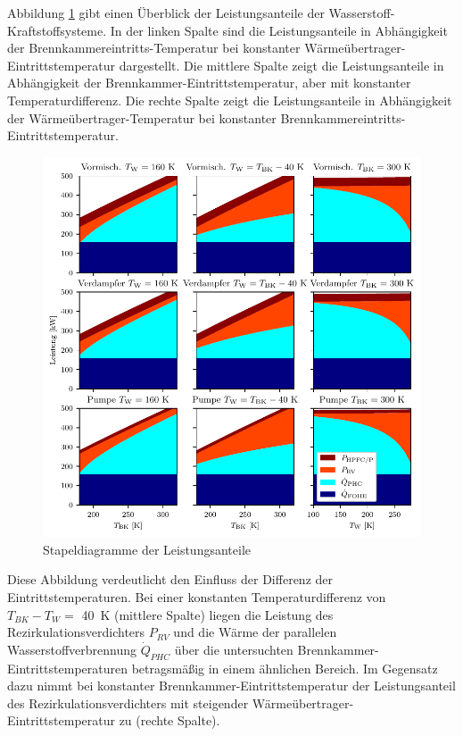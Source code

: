 Abbildung \ref{fig:stackplot} gibt einen Überblick der Leistungsanteile der Wasserstoff-Kraftstoffsysteme. In der linken Spalte sind die Leistungsanteile in Abhängigkeit der Brennkammereintritts-Temperatur bei konstanter Wärmeübertrager-Eintrittstemperatur dargestellt. Die mittlere Spalte zeigt die Leistungsanteile in Abhängigkeit der Brennkammer-Eintrittstemperatur, aber mit konstanter Temperaturdifferenz. Die rechte Spalte zeigt die Leistungsanteile in Abhängigkeit der Wärmeübertrager-Temperatur bei konstanter Brennkammereintritts-Eintrittstemperatur.

\begin{figure}[ht]
\centering
\includegraphics[width=1\linewidth]{4_Abbildungen/2_Hauptteil/Ergebnisse/stackplot_summary.pdf}
  \caption{Stapeldiagramme der Leistungsanteile}
  \label{fig:stackplot}
\end{figure}
\FloatBarrier

Diese Abbildung verdeutlicht den Einfluss der Differenz der Eintrittstemperaturen. Bei einer konstanten Temperaturdifferenz von $T_{BK}-T_W=$ \SI{40}{\K} (mittlere Spalte) liegen die Leistung des Rezirkulationsverdichters $P_{RV}$ und die Wärme der parallelen Wasserstoffverbrennung $\dot{Q}_{PHC}$ über die untersuchten Brennkammer-Eintrittstemperaturen betragsmäßig in einem ähnlichen Bereich. Im Gegensatz dazu nimmt bei konstanter Brennkammer-Eintrittstemperatur der Leistungsanteil des Rezirkulationsverdichters mit steigender Wärmeübertrager-Eintrittstemperatur zu (rechte Spalte).

